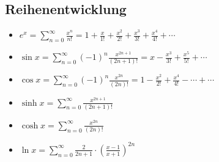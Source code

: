\subsection{Reihenentwicklung}
\begin{itemize}[leftmargin=*]
	\item $e^x = \sum_{n=0}^\infty \frac{x^n}{n!} = 1 + \frac{x}{1!} + \frac{x^2}{2!} + \frac{x^3}{3!} + 
				 \frac{x^4}{4!} + \cdots$
	\item $\sin x = \sum_{n=0}^\infty (-1)^n \frac{x^{2n + 1}}{(2n + 1)!} = x - \frac{x^3}{3!} + \frac{x^5}{5!} + \cdots$
	\item $\cos x = \sum_{n=0}^\infty (-1)^n \frac{x^{2n}}{(2n)!} = 1 - \frac{x^2}{2!} + \frac{x^4}{4!} - \cdots + \cdots$
	\item $\sinh x = \sum_{n=0}^\infty \frac{x^{2n+1}}{(2n + 1)!}$
	\item $\cosh x = \sum_{n=0}^\infty \frac{x^{2n}}{(2n)!}$
	\item $\ln x = \sum_{n=0}^\infty \frac{2}{2n + 1} \cdot \left(\frac{x-1}{x+1} \right)^{2n}$
\end{itemize}

